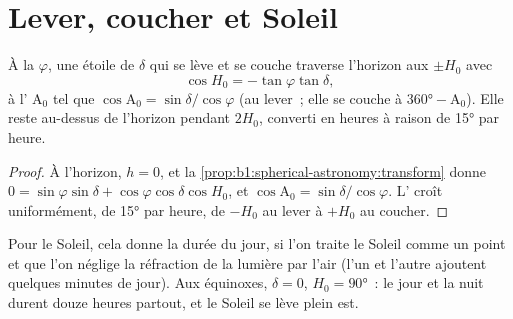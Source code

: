 \section{Lever, coucher et Soleil}

\begin{proposition}\label{prop:b1:spherical-astronomy:rising}
À la  $\varphi$, une étoile de  $\delta$ qui se lève et se
couche traverse l'horizon aux  $\pm H_0$ avec
\[
  \cos H_0 = -\tan\varphi\tan\delta ,
\]
à l' $\mathrm{A}_0$ tel que $\cos\mathrm{A}_0 = \sin\delta/\cos\varphi$
(au lever~; elle se couche à $\ang{360} - \mathrm{A}_0$). Elle reste au-dessus
de l'horizon pendant $2H_0$, converti en heures à raison de \ang{15} par heure.
\end{proposition}

\begin{proof}
À l'horizon, $h = 0$, et la \cref{prop:b1:spherical-astronomy:transform}
donne $0 = \sin\varphi\sin\delta + \cos\varphi\cos\delta\cos H_0$, et
$\cos\mathrm{A}_0 = \sin\delta/\cos\varphi$. L' croît
uniformément, de \ang{15} par heure, de $-H_0$ au lever à $+H_0$ au coucher.
\end{proof}

Pour le Soleil, cela donne la durée du jour, si l'on traite le Soleil comme un
point et que l'on néglige la réfraction de la lumière par l'air (l'un et
l'autre ajoutent quelques minutes de jour). Aux équinoxes, $\delta = 0$,
$H_0 = \ang{90}$~: le jour et la nuit durent douze heures partout, et le Soleil
se lève plein est.

